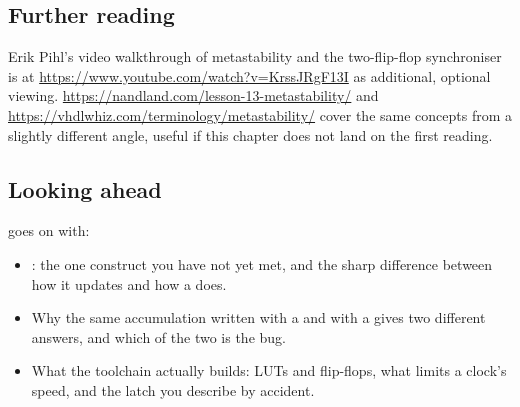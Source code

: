 \subsection*{Further reading}
Erik Pihl's video walkthrough of metastability and the two-flip-flop synchroniser is at
\url{https://www.youtube.com/watch?v=KrssJRgF13I} as additional, optional viewing.
\url{https://nandland.com/lesson-13-metastability/} and
\url{https://vhdlwhiz.com/terminology/metastability/} cover the same concepts from a slightly
different angle, useful if this chapter does not land on the first reading.

\subsection*{Looking ahead}
 goes on with:
\begin{itemize}
  \item {}: the one construct you have not yet met, and the sharp difference between
    how it updates and how a  does.
  \item Why the same accumulation written with a  and with a  gives two
    different answers, and which of the two is the bug.
  \item What the toolchain actually builds: LUTs and flip-flops, what limits a clock's speed, and
    the latch you describe by accident.
\end{itemize}
